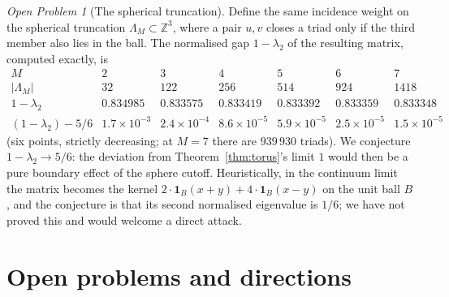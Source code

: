 \documentclass[11pt]{amsart}
\newcommand{\Z}{\mathbb{Z}}
\newcommand{\Lam}{\Lambda_M}
\theoremstyle{plain}
\theoremstyle{definition}
\theoremstyle{remark}
\newtheorem{openproblem}[theorem]{Open Problem}
\begin{document}
\begin{openproblem}[The spherical truncation]
\label{prob:56}
Define the same incidence weight on the spherical truncation $\Lam \subset \Z^3$, where a pair
$u, v$ closes a triad only if the third member also lies in the ball. The normalised gap
$1 - \lambda_2$ of the resulting matrix, computed exactly, is
\[
\begin{array}{c|cccccc}
M & 2 & 3 & 4 & 5 & 6 & 7\\ \hline
|\Lam| & 32 & 122 & 256 & 514 & 924 & 1418\\
1-\lambda_2 & 0.834985 & 0.833575 & 0.833419 & 0.833392 & 0.833359 & 0.833348\\
(1-\lambda_2) - 5/6 & 1.7\times10^{-3} & 2.4\times10^{-4} & 8.6\times10^{-5} & 5.9\times10^{-5} & 2.5\times10^{-5} & 1.5\times10^{-5}
\end{array}
\]
(six points, strictly decreasing; at $M = 7$ there are $939\,930$ triads). We conjecture
$1 - \lambda_2 \to 5/6$: the deviation from Theorem~\ref{thm:torus}'s limit $1$ would then be a
pure boundary effect of the sphere cutoff. Heuristically, in the continuum limit the matrix becomes
the kernel $2\cdot\mathbf 1_B(x+y) + 4\cdot\mathbf 1_B(x-y)$ on the unit ball $B$, and the
conjecture is that its second normalised eigenvalue is $1/6$; we have not proved this and would
welcome a direct attack.
\end{openproblem}

\section{Open problems and directions}
\label{sec:open}
\end{document}
